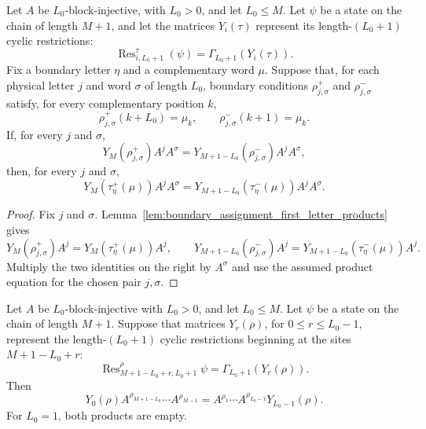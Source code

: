 \begin{theorem}
    \label{thm:boundary_closing_product_pointwise_compatible_boundary_assignments}
    \leanok
    Let $A$ be $L_0$-block-injective, with $L_0>0$, and let $L_0\le M$.
    Let $\psi$ be a state on the chain of length $M+1$, and let the matrices
    $Y_i(\tau)$ represent its length-$(L_0+1)$ cyclic restrictions:
    \[
        \operatorname{Res}^{\tau}_{i,L_0+1}(\psi)
        =
        \Gamma_{L_0+1}(Y_i(\tau)).
    \]
    Fix a boundary letter $\eta$ and a complementary word $\mu$. Suppose that,
    for each physical letter $j$ and word $\sigma$ of length $L_0$, boundary
    conditions $\rho^+_{j,\sigma}$ and $\rho^-_{j,\sigma}$ satisfy, for every
    complementary position $k$,
    \[
        \rho^+_{j,\sigma}(k+L_0)=\mu_k,
        \qquad
        \rho^-_{j,\sigma}(k+1)=\mu_k .
    \]
    If, for every $j$ and $\sigma$,
    \[
        Y_M(\rho^+_{j,\sigma})A^jA^\sigma
        =
        Y_{M+1-L_0}(\rho^-_{j,\sigma})A^jA^\sigma ,
    \]
    then, for every $j$ and $\sigma$,
    \[
        Y_M(\tau^+_\eta(\mu))A^jA^\sigma
        =
        Y_{M+1-L_0}(\tau^-_\eta(\mu))A^jA^\sigma .
    \]
\end{theorem}

\begin{proof}
    \leanok
    Fix $j$ and $\sigma$. Lemma~\ref{lem:boundary_assignment_first_letter_products}
    gives
    \[
        Y_M(\rho^+_{j,\sigma})A^j
        =
        Y_M(\tau^+_\eta(\mu))A^j,
        \qquad
        Y_{M+1-L_0}(\rho^-_{j,\sigma})A^j
        =
        Y_{M+1-L_0}(\tau^-_\eta(\mu))A^j.
    \]
    Multiply the two identities on the right by $A^\sigma$ and use the assumed
    product equation for the chosen pair $j,\sigma$.
\end{proof}

\begin{lemma}
    \label{lem:boundary_closing_endpoint_word_products}
    \leanok
    Let \(A\) be \(L_0\)-block-injective with \(L_0>0\), and let \(L_0\le M\).
    Let \(\psi\) be a state on the chain of length \(M+1\). Suppose that
    matrices \(Y_r(\rho)\), for \(0\le r\le L_0-1\), represent the
    length-\((L_0+1)\) cyclic restrictions beginning at the sites
    \(M+1-L_0+r\):
    \[
        \operatorname{Res}^{\rho}_{M+1-L_0+r,L_0+1}\psi
        =
        \Gamma_{L_0+1}(Y_r(\rho)).
    \]
    Then
    \[
        Y_0(\rho)
        A^{\rho_{M+1-L_0}}\cdots A^{\rho_{M-1}}
        =
        A^{\rho_1}\cdots A^{\rho_{L_0-1}}
        Y_{L_0-1}(\rho).
    \]
    For \(L_0=1\), both products are empty.
\end{lemma}

